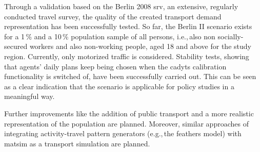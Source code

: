 Through a validation based on the Berlin 2008 \gls{srv}, an extensive, regularly conducted travel survey, the quality of the created transport demand representation has been successfully tested. So far, the Berlin II scenario exists for a 1\,\% and a 10\,\% population sample of all persons, i.e.,\,also non socially-secured workers and also non-working people, aged 18 and above for the study region. Currently, only motorized traffic is considered. Stability tests, showing that agents' daily plans keep being chosen when the \gls{cadyts} calibration functionality is switched of, have been successfully carried out. This can be seen as a clear indication that the scenario is applicable for policy studies in a meaningful way.

Further improvements like the addition of public transport and a more realistic representation of the population are planned. Moreover, similar approaches of integrating activity-travel pattern generators (e.g.,\,the \gls{feathers} model) with \gls{matsim} as a transport simulation are planned.

%
%


